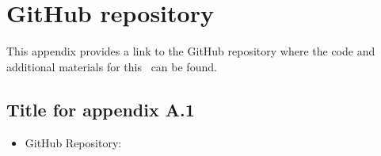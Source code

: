 

\chapter{GitHub repository}
\label{Appendix:Git_Repo}

This appendix provides a link to the GitHub repository where the code and additional materials for this \documenttype\ can be found.

\section{Title for appendix A.1}

\begin{itemize}
    \item GitHub Repository: \gitrepo
\end{itemize}



